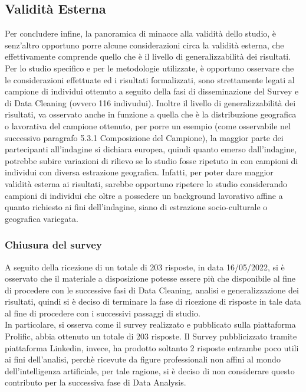\subsection{Validità Esterna}
Per concludere infine, la panoramica di minacce alla validità dello studio, è senz'altro opportuno porre alcune considerazioni circa la validità esterna, che effettivamente comprende quello che è il livello di generalizzabilità dei risultati. Per lo studio specifico e per le metodologie utilizzate, è opportuno osservare che le considerazioni effettuate ed i risultati formalizzati, sono strettamente legati al campione di individui ottenuto a seguito della fasi di disseminazione del Survey e di Data Cleaning (ovvero 116 indivudui). Inoltre il livello di generalizzabilità dei risultati, va osservato anche in funzione a quella che è la distribuzione geografica o lavorativa del campione ottenuto, per porre un esempio (come osservabile nel successivo paragrafo 5.3.1 Composizione del Campione), la maggior parte dei partecipanti all'indagine si dichiara europea, quindi quanto emerso dall'indagine, potrebbe subire variazioni di rilievo se lo studio fosse ripetuto in con campioni di individui con diversa estrazione geografica. Infatti, per poter dare maggior validità esterna ai risultati, sarebbe opportuno ripetere lo studio considerando campioni di individui che oltre a possedere un background lavorativo affine a quanto richiesto ai fini dell'indagine, siano di estrazione socio-culturale o geografica variegata.


 \subsubsection{Chiusura del survey}
    A seguito della ricezione di un totale di 203 risposte, in data 16/05/2022, si è osservato che il materiale a disposizione potesse essere più che disponibile al fine di procedere con le successive fasi di Data Cleaning, analisi e generalizzazione dei risultati, quindi si è deciso di terminare la fase di ricezione di risposte in tale data al fine di procedere con i successivi passaggi di studio.\\
    In particolare, si osserva come il survey realizzato e pubblicato sulla piattaforma Prolific, abbia ottenuto un totale di 203 risposte. Il Survey pubblicizzato tramite piattaforma Linkedin, invece, ha prodotto soltanto 2 risposte entrambe poco utili ai fini dell'analisi, perchè ricevute da figure professionali non affini al mondo dell'intelligenza artificiale, per tale ragione, si è deciso di non considerare questo contributo per la successiva fase di Data Analysis.
\newpage
